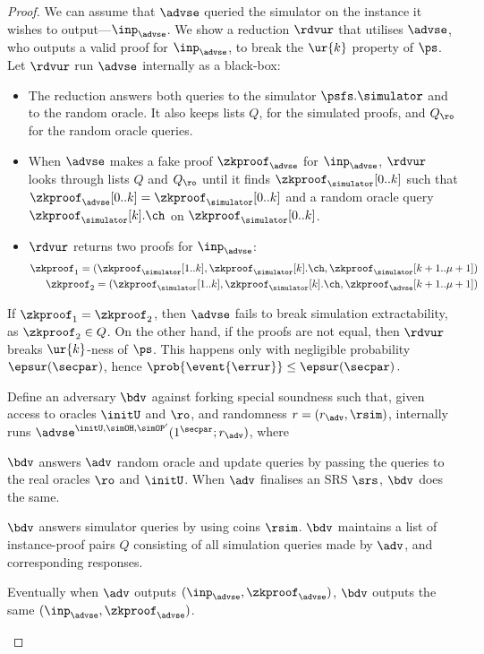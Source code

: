 \begin{proof}
{		We can assume that $\advse$ queried the simulator on the instance it wishes to
		output---$\inp_{\advse}$. We show a reduction $\rdvur$ that utilises $\advse$,
		who outputs a valid proof for $\inp_{\advse}$, to break the $\ur{k}$ property of
		$\ps$. Let $\rdvur$ run $\advse$ internally as a black-box:
		\begin{itemize}
			\item The reduction answers both queries to the simulator $\psfs.\simulator$ and to the random oracle. 
			It also keeps lists $Q$, for the simulated proofs, and $Q_\ro$ for the random oracle queries. 
			\item When $\advse$ makes a fake proof $\zkproof_{\advse}$ for $\inp_{\advse}$,
			$\rdvur$ looks through lists $Q$ and $Q_\ro$ until it finds
			$\zkproof_{\simulator}[0..k]$ such that
			$\zkproof_{\advse}[0..k] = \zkproof_{\simulator}[0..k]$
			and a random oracle query $\zkproof_{\simulator}[k].\ch$ on
			$\zkproof_{\simulator}[0..k]$.
			\item $\rdvur$ returns two proofs for $\inp_{\advse}$:
			\begin{align*}
			\zkproof_1 = (\zkproof_{\simulator}[1..k],
			\zkproof_{\simulator}[k].\ch, \zkproof_{\simulator}[k + 1..\mu + 1])\\
			\zkproof_2 = (\zkproof_{\simulator}[1..k],
			\zkproof_{\simulator}[k].\ch, \zkproof_{\advse}[k + 1..\mu + 1])
			\end{align*}
		\end{itemize}  
		If $\zkproof_1 = \zkproof_2$, then $\advse$ fails to break simulation
		extractability, as $\zkproof_2 \in Q$. On the other hand, if the proofs are
		not equal, then $\rdvur$ breaks $\ur{k}$-ness of $\ps$. This happens only with
		negligible probability $\epsur(\secpar)$, hence \( \prob{\event{\errur}} \leq
		\epsur(\secpar)\,. \)
	}
	 Define an adversary $\bdv$ against forking special soundness such that,
	given access to oracles $\initU$ and $\ro$, and randomness $r = (r_\adv, \rsim)$,
	internally runs $\advse^{\initU, \simOH, \simOP'} (1^\secpar; r_\adv)$,
	where
	\begin{compactenum}
		\item $\bdv$ answers $\adv$ random oracle and update queries by passing the queries to the real
		oracles $\ro$ and $\initU$. When $\adv$ finalises an SRS $\srs$, $\bdv$ does the same.
		\item $\bdv$ answers simulator queries by using coins $\rsim$. $\bdv$ maintains a
		list of instance-proof pairs $Q$ consisting of all simulation queries made by
		$\adv$, and corresponding responses.
		\item Eventually when $\adv$ outputs $(\inp_\advse, \zkproof_\advse)$, $\bdv$ outputs
		the same $(\inp_\advse, \zkproof_\advse)$.
	\end{compactenum}
	

\end{proof}

